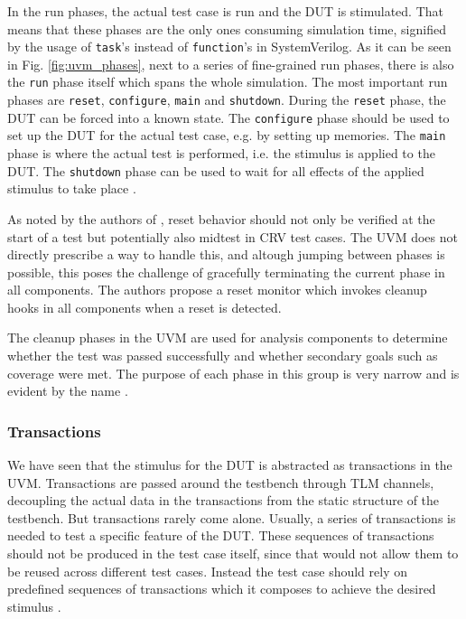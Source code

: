 \documentclass[11pt,a4paper]{report}
\newcommand{\ttt}{\texttt}
\begin{document}
In the run phases, the actual test case is run and the DUT is stimulated. That means that these phases are the only
ones consuming simulation time, signified by the usage of \ttt{task}'s instead of \ttt{function}'s in SystemVerilog.
As it can be seen in Fig. \ref{fig:uvm_phases}, next to a series of fine-grained run phases, there is also the
\ttt{run} phase itself which spans the whole simulation. The most important run phases are \ttt{reset},
\ttt{configure}, \ttt{main} and \ttt{shutdown}. During the \ttt{reset} phase, the DUT can be forced into a known
state. The \ttt{configure} phase should be used to set up the DUT for the actual test case, e.g. by setting up
memories. The \ttt{main} phase is where the actual test is performed, i.e. the stimulus is applied to the DUT. The
\ttt{shutdown} phase can be used to wait for all effects of the applied stimulus to take place \cite[ch. 4.6]{mehta2018asic}.

As noted by the authors of \cite{dvcon2014reset}, reset behavior should not only be verified at the start of a test
but potentially also midtest in CRV test cases. The UVM does not directly prescribe a way to handle this, and altough
jumping between phases is possible, this poses the challenge of gracefully terminating the current phase in all
components. The authors propose a reset monitor which invokes cleanup hooks in all components when a reset is detected.

The cleanup phases in the UVM are used for analysis components to determine whether the test was passed successfully
and whether secondary goals such as coverage were met. The purpose of each phase in this group is very narrow and is
evident by the name \cite[ch. 4.6]{mehta2018asic}.

\subsubsection{Transactions} %

We have seen that the stimulus for the DUT is abstracted as transactions in the UVM. Transactions are passed around
the testbench through TLM channels, decoupling the actual data in the transactions from the static structure of the
testbench. But transactions rarely come alone. Usually, a series of transactions is needed to test a specific feature
of the DUT. These sequences of transactions should not be produced in the test case itself, since that would not
allow them to be reused across different test cases. Instead the test case should rely on predefined sequences of
transactions which it composes to achieve the desired stimulus \cite[Ch. 23]{salemi2013uvm}.
\end{document}
